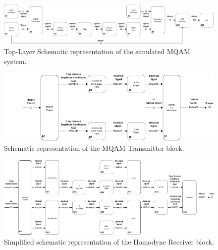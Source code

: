 	\begin{figure}[h]
		\centering
		\includegraphics[width=1\textwidth]
			{./sdf/m_qam_system/figures/simulations/blockDiagrams/simulation_mqam}
		\caption{Top-Layer Schematic representation of the simulated MQAM 
		system.}\label{fig:sim_systemDiagram}
	\end{figure}
	\begin{figure}[]
		\centering
		\includegraphics[width=1\textwidth]
			{./sdf/m_qam_system/figures/simulations/blockDiagrams/simulation_tx}
		\caption{Schematic representation of the MQAM Transmitter 
		block.}\label{fig:sim_txDiagram}
	\end{figure}
	\begin{figure}[]
		\centering
		\includegraphics[width=1\textwidth]
			{./sdf/m_qam_system/figures/simulations/blockDiagrams/simulation_rx}
		\caption{Simplified schematic representation of the Homodyne Receiver 
block.}\label{fig:simulation_rx}
	\end{figure}

